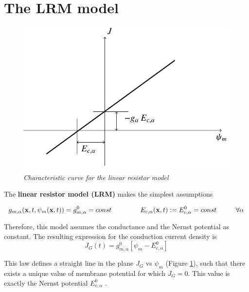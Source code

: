 \documentclass[12pt, a4paper]{report}
\begin{document}
\section{The LRM model}

\begin{figure}[H]
	\begin{center}
		\includegraphics[scale=0.7]{LRM.png} 
	\end{center} 
	\caption{\textit{Characteristic curve for the linear resistor model}} \label{LRM}
	
\end{figure}

The \textbf{linear resistor model (LRM)} makes the simplest assumptions 

\begin{equation}
g_{m,\alpha}(\textbf{x},t,\psi_m(\textbf{x},t)) = g_{m,\alpha}^0 = const \hspace{1.5 cm} E_{c,\alpha}(\textbf{x},t) := E_{c,\alpha}^0 = const \hspace{1cm} \forall \alpha
\end{equation}

Therefore, this model assumes the conductance and the Nernst potential as constant.
The resulting expression for the conduction current density is
\begin{equation}
J_G(t) = g_{m,\alpha}^0 [\psi_m -  E_{c,\alpha}^0]
\end{equation}

This law defines a straight line in the plane $J_G$ vs $\psi_m$ (Figure \ref*{LRM}), such that there exists a unique value of membrane potential for which $J_G=0$. This value is exactly the Nernst potential $E_{c,\alpha}^0$ .
\end{document}
